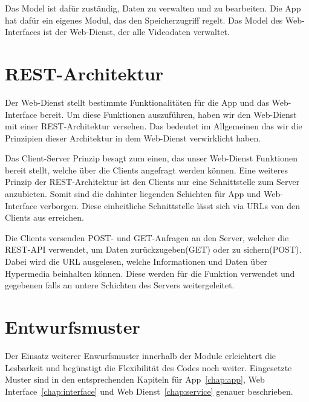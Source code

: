 Das Model ist dafür zuständig, Daten zu verwalten und zu bearbeiten. Die App hat dafür ein eigenes Modul, das den Speicherzugriff regelt. Das Model des Web-Interfaces ist der Web-Dienst, der alle Videodaten verwaltet.\newline\par

\section{REST-Architektur} \label{allg:Rest}

Der Web-Dienst stellt bestimmte Funktionalitäten für die App und das Web-Interface bereit. Um diese Funktionen auszuführen, haben wir den Web-Dienst mit einer REST-Architektur  versehen. Das bedeutet im Allgemeinen das wir die Prinzipien dieser Architektur in dem Web-Dienst verwirklicht haben.\newline

Das Client-Server Prinzip besagt zum einen, das unser Web-Dienst Funktionen bereit stellt, welche über die Clients angefragt werden können. Eine weiteres Prinzip der REST-Architektur ist den Clients nur eine Schnittstelle zum Server anzubieten. Somit sind die dahinter liegenden Schichten für App und Web-Interface verborgen. Diese einheitliche Schnittstelle lässt sich via URLs von den Clients aus erreichen.\newline

Die Clients versenden POST- und GET-Anfragen an den Server, welcher die REST-API verwendet, um Daten zurückzugeben(GET) oder zu sichern(POST). Dabei wird die URL ausgelesen, welche Informationen und Daten über Hypermedia beinhalten können. Diese werden für die Funktion verwendet und gegebenen falls an untere Schichten des Servers weitergeleitet.\newline

\section{Entwurfsmuster} \label{allg:Entwurfsmuster}
Der Einsatz weiterer Enwurfsmuster innerhalb der Module erleichtert die Lesbarkeit und begünstigt die Flexibilität des Codes noch weiter. Eingesetzte Muster sind in den entsprechenden Kapiteln für App~\eqref{chap:app}, Web Interface~\eqref{chap:interface} und Web Dienst~\eqref{chap:service} genauer beschrieben.